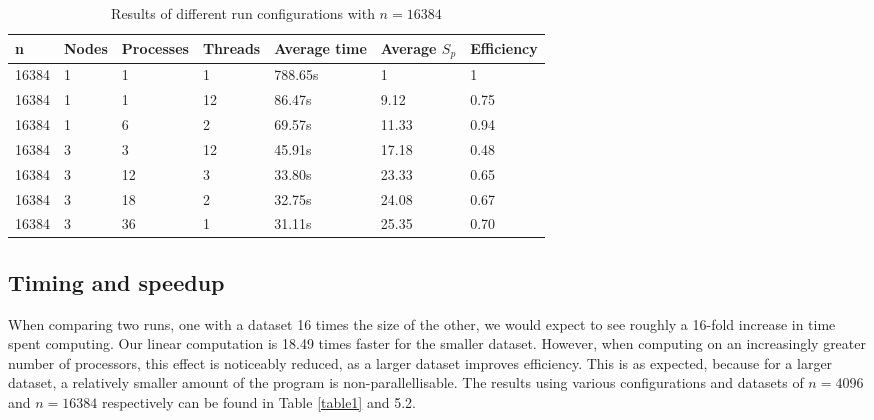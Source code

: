 \begin{table}[h]
   \centering
    \begin{tabular}{| l | l | l | l | l | l | l |}
    \hline
    \bf{n} & \bf{Nodes} & \bf{Processes} &\bf{Threads} & \bf{Average time} & \bf{Average }$S_{p}$ & \bf{Efficiency} \\ \hline
    	16384 & 1 & 1 & 1 & 788.65s & 1 & 1 \\ \hline
	16384 & 1 & 1 & 12 & 86.47s & 9.12 & 0.75 \\ \hline
	16384 & 1 & 6 & 2 & 69.57s & 11.33 & 0.94 \\ \hline
	16384 & 3 & 3 & 12 & 45.91s & 17.18 & 0.48 \\ \hline
	16384 & 3 & 12 & 3 & 33.80s & 23.33 & 0.65 \\ \hline
	16384 & 3 & 18 & 2 & 32.75s & 24.08 & 0.67 \\ \hline	
	16384 & 3 & 36 & 1 & 31.11s & 25.35 & 0.70  \\ \hline
    \end{tabular}
	\label{table2}
  \caption{Results of different run configurations with $n = 16384$}
\end{table}

\subsection{Timing and speedup}
When comparing two runs, one with a dataset 16 times the size of the other, we
would expect to see roughly a 16-fold increase in time spent computing. Our
linear computation is 18.49 times faster for the smaller dataset. However, when
computing on an increasingly greater number of processors, this effect is
noticeably reduced, as a larger dataset improves efficiency. This is as
expected, because for a larger dataset, a relatively smaller amount of the
program is non-parallellisable. The results using various configurations and
datasets of $n = 4096$ and $n = 16384$ respectively can be found in Table
\ref{table1} and 5.2.

